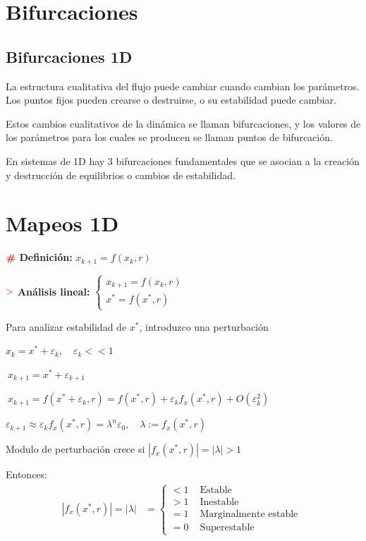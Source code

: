 \documentclass[%
 reprint,
 amsmath,amssymb,
 aps,
]{revtex4-1}
\newcommand{\propiedad}{\textcolor{red}{\mathbf{>}}}
\newcommand{\definir}{\color{red}{\textbf{\#}}}
\begin{document}
\section{Bifurcaciones}

\subsection{Bifurcaciones 1D}

La estructura cualitativa del flujo puede cambiar cuando cambian los parámetros. Los puntos fijos pueden crearse o destruirse, o su estabilidad puede cambiar.

Estos cambios cualitativos de la dinámica se llaman bifurcaciones, y los valores de los parámetros para los cuales se producen se llaman puntos de bifurcación. 

En sistemas de 1D hay 3 bifurcaciones fundamentales que se asocian a la creación y destrucción de equilibrios o cambios de estabilidad.

\section{Mapeos 1D}

$\definir$ \textbf{Definición:} 
$
x_{k+1} = f(x_k , r)
$

$\propiedad$ \textbf{Análisis lineal:}
$
\left\lbrace 
\begin{array}{l}
x_{k+1} = f(x_k , r) \\
x^{*} = f(x^{*}, r)
\end{array}
\right.
$

Para analizar estabilidad de $x^{*}$, introduzco una perturbación

$x_k = x^{*}+\varepsilon_k, \quad \varepsilon_k <<1 $

$\ x_{k+1} = {x}^{*} + \varepsilon_{k+1}$

$\ x_{k+1} = f\left(x^{*}+\varepsilon_{k}, r \right) 
= f\left(x^{*}, r\right)
+ \varepsilon_{k} f_{x}\left(x^{*}, r\right)
+ O\left(\varepsilon^{2}_{k}\right)$

$\varepsilon_{k+1} \approx \varepsilon_{k} f_{x}\left(x^{*}, r\right)
= \lambda^n \varepsilon_0, \quad \lambda := f_{x}\left(x^{*},r\right)$

Modulo de perturbación crece si $|f_{x}\left(x^{*},r\right)| = |\lambda| > 1$

Entonces:
$$
\begin{aligned}
|f_{x}\left(x^{*},r\right)| = |\lambda| &=\left\{\begin{array}{ll}
<1 & \text { Estable } \\
>1 & \text { Inestable } \\
=1 & \text { Marginalmente estable } \\
=0 & \text { Superestable }
\end{array}\right.
\end{aligned}
$$
\end{document}
